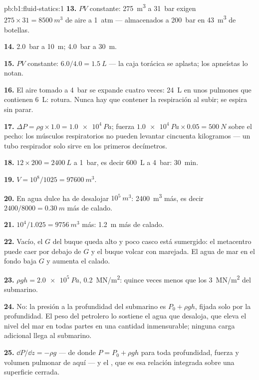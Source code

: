 \begin{solution}{pb:b1:fluid-statics:1}
\textbf{13.} $PV$ constante: \qty{275}{m^3} a \qty{31}{bar} exigen $275 \times 31
= \qty{8500}{m^3}$ de aire a \qty{1}{atm} --- almacenados a \qty{200}{bar} en
\qty{43}{m^3} de botellas.

\textbf{14.} \qty{2.0}{bar} a \qty{10}{m}; \qty{4.0}{bar} a \qty{30}{m}.

\textbf{15.} $PV$ constante: $6.0/4.0 = \qty{1.5}{L}$ --- la caja torácica se
aplasta; los apneístas lo notan.

\textbf{16.} El aire tomado a \qty{4}{bar} se expande cuatro veces: \qty{24}{L} en unos
pulmones que contienen \qty{6}{L}: rotura. Nunca hay que contener la
respiración al subir; se espira sin parar.

\textbf{17.} $\Delta P = \rho g \times 1.0 = \qty{1.0e4}{Pa}$; fuerza $\qty{1.0e4}{Pa}
\times 0.05 = \qty{500}{N}$ sobre el pecho: los músculos respiratorios no
pueden levantar cincuenta kilogramos --- un tubo respirador solo sirve en los primeros decímetros.

\textbf{18.} $12 \times 200 = \qty{2400}{L}$ a \qty{1}{bar}, es decir \qty{600}{L}
a \qty{4}{bar}: \qty{30}{min}.

\textbf{19.} $V = 10^8/1025 = \qty{97600}{m^3}$.

\textbf{20.} En agua dulce ha de desalojar $10^5\ \unit{m^3}$: \qty{2400}{m^3}
más, es decir $2400/8000 = \qty{0.30}{m}$ más de calado.

\textbf{21.} $10^4/1.025 = \qty{9756}{m^3}$ más: \qty{1.2}{m} más de calado.

\textbf{22.} Vacío, el $G$ del buque queda alto y poco casco está sumergido:
el metacentro puede caer por debajo de $G$ y el buque volcar con marejada.
El agua de mar en el fondo baja $G$ y aumenta el calado.

\textbf{23.} $\rho gh = \qty{2.0e5}{Pa}$, \qty{0.2}{MN/m^2}: quince veces menos
que los \qty{3}{MN/m^2} del submarino.

\textbf{24.} No: la presión a la profundidad del submarino es $P_0 + \rho gh$,
fijada solo por la profundidad. El peso del petrolero lo sostiene el agua
que desaloja, que eleva el nivel del mar en todas partes en una cantidad
inmensurable; ninguna carga adicional llega al submarino.

\textbf{25.} $\dd P/\dd z = -\rho g$ --- de donde $P = P_0 + \rho gh$ para toda
profundidad, fuerza y volumen pulmonar de aquí --- y el , que es esa relación integrada sobre una superficie cerrada.
\end{solution}
